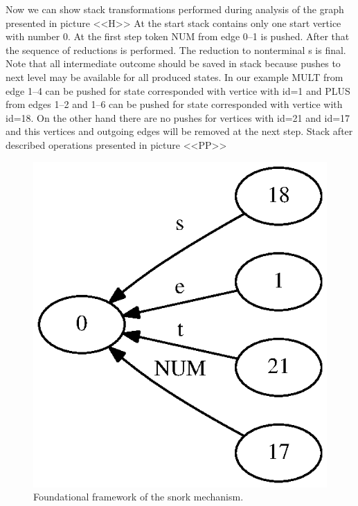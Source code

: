 \documentclass{sigplanconf}
\begin{document}
Now we can show stack transformations performed during analysis of the graph presented in picture <<H>> At the start stack contains only one start vertice with number 0. At the first step token NUM from edge 0--1 is pushed. After that the sequence of reductions is performed. The reduction to nonterminal s is final. Note that all intermediate outcome should be saved in stack because pushes to next level may be available for all produced states.  In our example MULT from edge 1--4 can be pushed for state corresponded with vertice with id=1 and PLUS from edges 1--2 and 1--6 can be pushed for state corresponded with vertice with id=18. On the other hand there are no pushes for vertices with id=21 and id=17 and this vertices and outgoing edges will be removed at the next step. Stack after described operations presented in picture <<PP>>

\begin{figure}
    \begin{center}
        \includegraphics[scale=0.65]{Graphs/stack_1_2.eps}
    \end{center}
    \caption{Foundational framework of the snork mechanism.}
    \label{fig-ffsm}
\end{figure}
\end{document}
